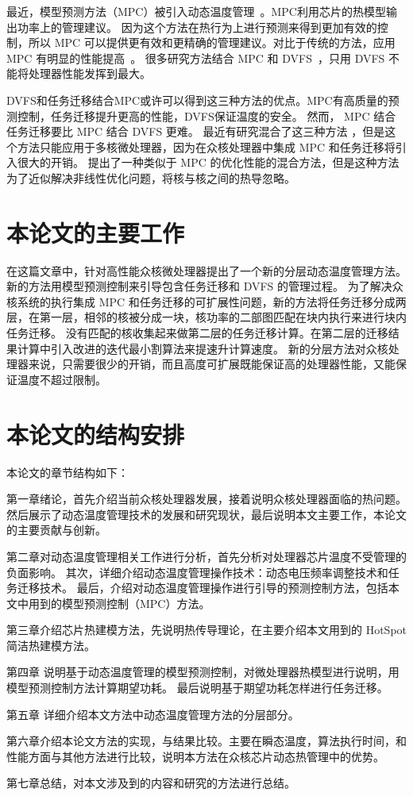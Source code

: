  最近，模型预测方法（MPC）被引入动态温度管理~\cite{Zanini:ECCTD'09,Wang:ISCA'09,Bartolini:TPDS'13}。MPC利用芯片的热模型输出功率上的管理建议。
 因为这个方法在热行为上进行预测来得到更加有效的控制，所以 MPC 可以提供更有效和更精确的管理建议。对比于传统的方法，应用 MPC 有明显的性能提高~\cite{Bartolini:TPDS'13}。
 很多研究方法结合 MPC 和 DVFS~\cite{Zanini:ECCTD'09,Wang:ISCA'09,Bartolini:TPDS'13}，只用 DVFS 不能将处理器性能发挥到最大。
 
 DVFS和任务迁移结合MPC或许可以得到这三种方法的优点。MPC有高质量的预测控制，任务迁移提升更高的性能，DVFS保证温度的安全。
 然而， MPC 结合任务迁移要比 MPC 结合 DVFS 更难。
 最近有研究混合了这三种方法 \cite{MaWang:APCCAS'14}，但是这个方法只能应用于多核微处理器，因为在众核处理器中集成 MPC 和任务迁移将引入很大的开销。
 \cite{Hanumaiah:TCAD'11} 提出了一种类似于 MPC 的优化性能的混合方法，但是这种方法为了近似解决非线性优化问题，将核与核之间的热导忽略。
 
 \section{本论文的主要工作}\label{sec:thispaper}
在这篇文章中，针对高性能众核微处理器提出了一个新的分层动态温度管理方法。
新的方法用模型预测控制来引导包含任务迁移和 DVFS 的管理过程。
为了解决众核系统的执行集成 MPC 和任务迁移的可扩展性问题，新的方法将任务迁移分成两层，在第一层，相邻的核被分成一块，核功率的二部图匹配在块内执行来进行块内任务迁移。
没有匹配的核收集起来做第二层的任务迁移计算。在第二层的迁移结果计算中引入改进的迭代最小割算法来提速升计算速度。
新的分层方法对众核处理器来说，只需要很少的开销，而且高度可扩展既能保证高的处理器性能，又能保证温度不超过限制。

 \section{本论文的结构安排}\label{sec:sec}
本论文的章节结构如下：

第一章绪论，首先介绍当前众核处理器发展，接着说明众核处理器面临的热问题。
然后展示了动态温度管理技术的发展和研究现状，最后说明本文主要工作，本论文的主要贡献与创新。

第二章对动态温度管理相关工作进行分析，首先分析对处理器芯片温度不受管理的负面影响。
其次，详细介绍动态温度管理操作技术：动态电压频率调整技术和任务迁移技术。
最后，介绍对动态温度管理操作进行引导的预测控制方法，包括本文中用到的模型预测控制（MPC）方法。

第三章介绍芯片热建模方法，先说明热传导理论，在主要介绍本文用到的 HotSpot 简洁热建模方法。

第四章 说明基于动态温度管理的模型预测控制，对微处理器热模型进行说明，用模型预测控制方法计算期望功耗。
最后说明基于期望功耗怎样进行任务迁移。

第五章 详细介绍本文方法中动态温度管理方法的分层部分。

第六章介绍本论文方法的实现，与结果比较。主要在瞬态温度，算法执行时间，和性能方面与其他方法进行比较，说明本方法在众核芯片动态热管理中的优势。

第七章总结，对本文涉及到的内容和研究的方法进行总结。























